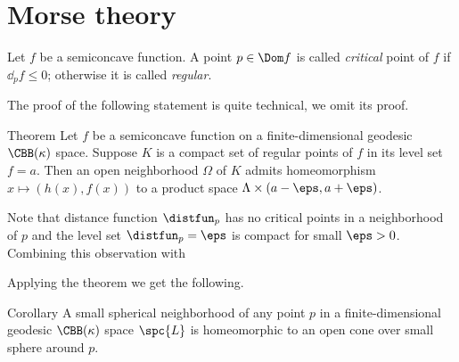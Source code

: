 \section{Morse theory}

Let $f$ be a semiconcave function.
A point $p\in \Dom f$ is called \emph{critical} point of $f$ if $\dd_pf\le 0$; 
otherwise it is called \emph{regular}.

The proof of the following statement is quite technical, we omit its proof.

\begin{thm}{Theorem}
Let $f$ be a semiconcave function on a finite-dimensional geodesic $\CBB(\kappa)$ space.
Suppose $K$ is a compact set of regular points of $f$ in its level set $f=a$.
Then an open neighborhood $\Omega$ of $K$ admits homeomorphism $x\mapsto (h(x),f(x))$ to a product space $\Lambda\times (a-\eps,a+\eps)$.

\end{thm}

Note that distance function $\distfun_p$ has no critical points in a neighborhood of $p$ and the level set $\distfun_p=\eps$ is compact for small $\eps>0$.
Combining this observation with 

Applying the theorem we get the following.

\begin{thm}{Corollary}
A small spherical neighborhood of any point $p$ in a finite-dimensional geodesic $\CBB(\kappa)$ space $\spc{L}$ is homeomorphic to an open cone over small sphere around $p$.
\end{thm}
